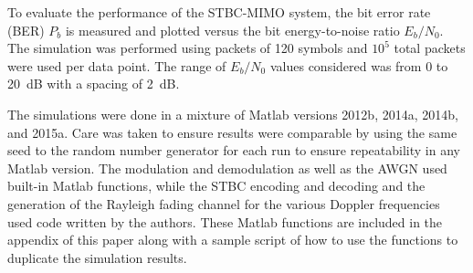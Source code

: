 To evaluate the performance of the STBC-MIMO system, the bit error rate (BER) $P_b$ is measured and plotted versus the bit energy-to-noise ratio $E_b/N_0$. The simulation was performed using packets of 120 symbols and $10^5$ total packets were used per data point. The range of $E_b/N_0$ values considered was from 0 to 20~dB with a spacing of 2~dB.

The simulations were done in a mixture of Matlab versions 2012b, 2014a, 2014b, and 2015a. Care was taken to ensure results were comparable by using the same seed to the random number generator for each run to ensure repeatability in any Matlab version. The modulation and demodulation as well as the AWGN used built-in Matlab functions, while the STBC encoding and decoding and the generation of the Rayleigh fading channel for the various Doppler frequencies used code written by the authors. These Matlab functions are included in the appendix of this paper along with a sample script of how to use the functions to duplicate the simulation results.